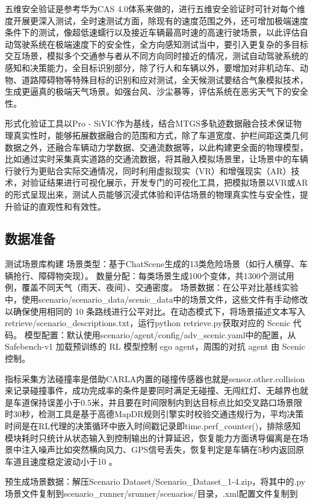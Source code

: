五维安全验证是参考华为CAS 4.0体系来做的，进行五维安全验证时可针对每个维度开展更深入测试，全时速测试方面，除现有的速度范围之外，还可增加极端速度条件下的测试，像超低速蠕行以及接近车辆最高时速的高速行驶场景，以此评估自动驾驶系统在极端速度下的安全性，全方向感知测试当中，要引入更复杂的多目标交互场景，模拟多个交通参与者从不同方向同时接近的情况，测试自动驾驶系统的感知和决策能力，全目标识别部分，除了行人和车辆以外，要增加对非机动车、动物、道路障碍物等特殊目标的识别和应对测试，全天候测试要结合气象模拟技术，生成更逼真的极端天气场景。如强台风、沙尘暴等，评估系统在恶劣天气下的安全性\cite{fitch2012using}。​


形式化验证工具以Pro - SiVIC作为基线，结合MTGS多轨迹数据融合技术保证物理真实性时，能够拓展数据融合的范围和方式，除了车道宽度、护栏间距这类几何数据之外，还融合车辆动力学数据、交通流数据等，以此构建更全面的物理模型，比如通过实时采集真实道路的交通流数据，将其融入模拟场景里，让场景中的车辆行驶行为更贴合实际交通情况，同时利用虚拟现实（VR）和增强现实（AR）技术，对验证结果进行可视化展示，开发专门的可视化工具，把模拟场景以VR或AR的形式呈现出来，测试人员能够沉浸式体验和评估场景的物理真实性与安全性，提升验证的直观性和有效性。

\subsection{数据准备}
测试场景库构建
场景类型：基于ChatScene生成的13类危险场景（如行人横穿、车辆抢行、障碍物突现）。
数量分配：每类场景生成100个变体，共1300个测试用例，覆盖不同天气（雨天、夜间）、交通密度。
场景数据：在公平对比基线实验中，使用scenario/scenario\_data/scenic\_data中的场景文件，这些文件有手动修改以确保使用相同的 10 条路线进行公平对比。在动态模式下，将场景描述文本写入retrieve/scenario\_descriptions.txt，运行python retrieve.py获取对应的 Scenic 代码。
模型配置：默认使用scenario/agent/config/adv\_scenic.yaml中的配置，从 Safebench-v1 加载预训练的 RL 模型控制 ego agent，周围的对抗 agent 由 Scenic 控制。

指标采集方法碰撞率是借助CARLA内置的碰撞传感器也就是sensor.other.collision来记录碰撞事件，成功完成率的条件是要同时满足无碰撞、无闯红灯、无越界也就是车道保持误差小于0.5米，并且要在时间限制内到达目标点比如交叉路口场景限时30秒，检测工具是基于高德MapDR规则引擎实时校验交通违规行为，平均决策时间是在RL代理的决策循环中嵌入时间戳记录即time.perf\_counter()，排除感知模块耗时只统计从状态输入到控制输出的计算延迟，恢复能力方面诱导偏离是在场景中注入噪声比如突然横向风力、GPS信号丢失，恢复判定是车辆在5秒内返回原车道且速度稳定波动小于10 。

预生成场景数据：解压Scenario Dataset/Scenario\_Dataset\_1-4.zip，将其中的.py场景文件复制到scenario\_runner/srunner/scenarios/目录，.xml配置文件复制到

